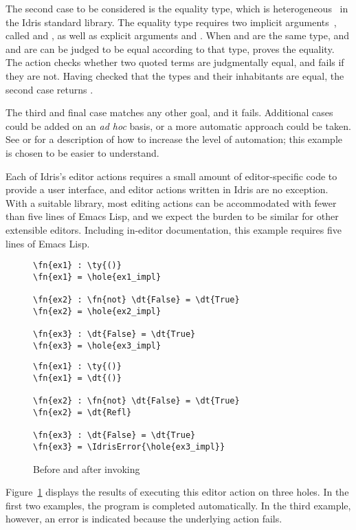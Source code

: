 The second case to be considered is the equality type, which is
heterogeneous~\citep{mcbridephd} in the Idris standard library.  The
equality type requires two implicit arguments~\citep{pollack}, called
 and , as well as explicit arguments  and .
When  and  are the same type, and  and  are
can be judged to be equal according to that type,  proves the
equality. The  action checks whether two quoted terms are
judgmentally equal, and fails if they are not. Having checked that the
types and their inhabitants are equal, the second case returns .

The third and final case matches any other goal, and it
fails. Additional cases could be added on an \emph{ad hoc} basis, or a
more automatic approach could be taken. See \citet{davidphd} or
\citet{elabref} for a description of how to increase the level of
automation; this example is chosen to be easier to understand.

Each of Idris's editor actions requires a small amount of
editor-specific code to provide a user interface, and editor actions
written in Idris are no exception. With a suitable library, most
editing actions can be accommodated with fewer than five lines of
Emacs Lisp, and we expect the burden to be similar for other
extensible editors. Including in-editor documentation, this example
requires five lines of Emacs Lisp.

\begin{figure}[h]
\begin{BVerbatim}
\fn{ex1} : \ty{()}
\fn{ex1} = \hole{ex1_impl}

\fn{ex2} : \fn{not} \dt{False} = \dt{True}
\fn{ex2} = \hole{ex2_impl}

\fn{ex3} : \dt{False} = \dt{True}
\fn{ex3} = \hole{ex3_impl}
\end{BVerbatim}
\hspace{1em}
\begin{BVerbatim}
\fn{ex1} : \ty{()}
\fn{ex1} = \dt{()}

\fn{ex2} : \fn{not} \dt{False} = \dt{True}
\fn{ex2} = \dt{Refl}

\fn{ex3} : \dt{False} = \dt{True}
\fn{ex3} = \IdrisError{\hole{ex3_impl}}
\end{BVerbatim}

  \caption{Before and after invoking }
  \label{fig:motivating-example-exec}
\end{figure}

Figure~\ref{fig:motivating-example-exec} displays the results of
executing this editor action on three holes. In the first two
examples, the program is completed automatically. In the third
example, however, an error is indicated because the underlying
 action fails.

